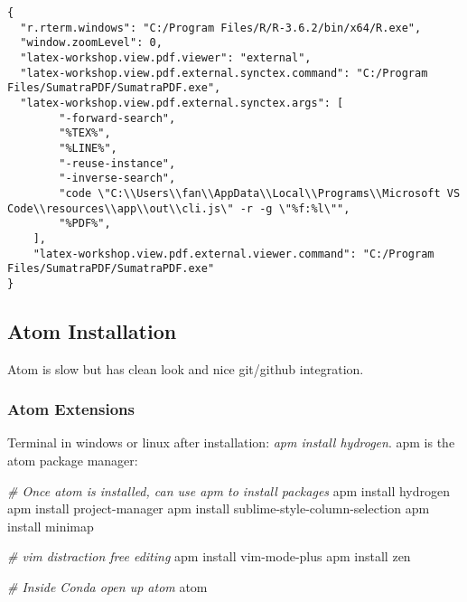 \documentclass[]{article}
\newenvironment{Shaded}{\begin{snugshade}}{\end{snugshade}}
\newcommand{\CommentTok}[1]{\textcolor[rgb]{0.56,0.35,0.01}{\textit{#1}}}
\newcommand{\ExtensionTok}[1]{#1}
\newcommand{\FunctionTok}[1]{\textcolor[rgb]{0.00,0.00,0.00}{#1}}
\newcommand{\NormalTok}[1]{#1}
\begin{document}
\begin{verbatim}
{
  "r.rterm.windows": "C:/Program Files/R/R-3.6.2/bin/x64/R.exe",
  "window.zoomLevel": 0,
  "latex-workshop.view.pdf.viewer": "external",
  "latex-workshop.view.pdf.external.synctex.command": "C:/Program Files/SumatraPDF/SumatraPDF.exe",
  "latex-workshop.view.pdf.external.synctex.args": [
        "-forward-search",
        "%TEX%",
        "%LINE%",
        "-reuse-instance",
        "-inverse-search",
        "code \"C:\\Users\\fan\\AppData\\Local\\Programs\\Microsoft VS Code\\resources\\app\\out\\cli.js\" -r -g \"%f:%l\"",
        "%PDF%",
    ],
    "latex-workshop.view.pdf.external.viewer.command": "C:/Program Files/SumatraPDF/SumatraPDF.exe"
}
\end{verbatim}

\hypertarget{atom-installation}{%
\subsection{Atom Installation}\label{atom-installation}}

Atom is slow but has clean look and nice git/github integration.

\hypertarget{atom-extensions}{%
\subsubsection{Atom Extensions}\label{atom-extensions}}

Terminal in windows or linux after installation: \emph{apm install
hydrogen}. apm is the atom package manager:

\begin{Shaded}
\begin{Highlighting}[]
\CommentTok{# Once atom is installed, can use apm to install packages}
\FunctionTok{apm}\NormalTok{ install hydrogen}
\FunctionTok{apm}\NormalTok{ install project-manager}
\FunctionTok{apm}\NormalTok{ install sublime-style-column-selection}
\FunctionTok{apm}\NormalTok{ install minimap}

\CommentTok{# vim distraction free editing}
\FunctionTok{apm}\NormalTok{ install vim-mode-plus}
\FunctionTok{apm}\NormalTok{ install zen}

\CommentTok{# Inside Conda open up atom}
\ExtensionTok{atom}
\end{Highlighting}
\end{Shaded}
\end{document}
